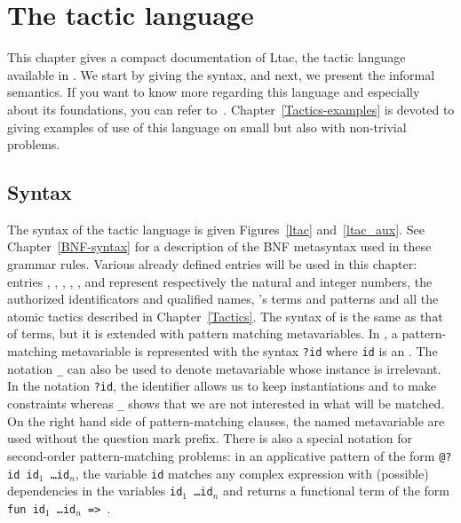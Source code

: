 \chapter[The tactic language]{The tactic language\label{TacticLanguage}}


This chapter gives a compact documentation of Ltac, the tactic
language available in {\Coq}. We start by giving the syntax, and next,
we present the informal semantics. If you want to know more regarding
this language and especially about its foundations, you can refer
to~\cite{Del00}. Chapter~\ref{Tactics-examples} is devoted to giving
examples of use of this language on small but also with non-trivial
problems.


\section{Syntax}

\def\tacexpr{\textrm{\textsl{expr}}}
\def\tacexprlow{\textrm{\textsl{tacexpr$_1$}}}
\def\tacexprinf{\textrm{\textsl{tacexpr$_2$}}}
\def\tacexprpref{\textrm{\textsl{tacexpr$_3$}}}
\def\atom{\textrm{\textsl{atom}}}
\def\letclause{\textrm{\textsl{let\_clause}}}
\def\matchrule{\textrm{\textsl{match\_rule}}}
\def\contextrule{\textrm{\textsl{context\_rule}}}
\def\contexthyp{\textrm{\textsl{context\_hyp}}}
\def\tacarg{\nterm{tacarg}}
\def\cpattern{\nterm{cpattern}}

The syntax of the tactic language is given Figures~\ref{ltac}
and~\ref{ltac_aux}. See Chapter~\ref{BNF-syntax} for a description of
the BNF metasyntax used in these grammar rules. Various already
defined entries will be used in this chapter: entries
{\naturalnumber}, {\integer}, {\ident}, {\qualid}, {\term},
{\cpattern} and {\atomictac} represent respectively the natural and
integer numbers, the authorized identificators and qualified names,
{\Coq}'s terms and patterns and all the atomic tactics described in
Chapter~\ref{Tactics}. The syntax of {\cpattern} is the same as that
of terms, but it is extended with pattern matching metavariables. In
{\cpattern}, a pattern-matching metavariable is represented with the
syntax {\tt ?id} where {\tt id} is an {\ident}. The notation {\tt \_}
can also be used to denote metavariable whose instance is
irrelevant. In the notation {\tt ?id}, the identifier allows us to
keep instantiations and to make constraints whereas {\tt \_} shows
that we are not interested in what will be matched. On the right hand
side of pattern-matching clauses, the named metavariable are used
without the question mark prefix. There is also a special notation for
second-order pattern-matching problems: in an applicative pattern of
the form {\tt @?id id$_1$ \ldots id$_n$}, the variable {\tt id}
matches any complex expression with (possible) dependencies in the
variables {\tt id$_1$ \ldots id$_n$} and returns a functional term of
the form {\tt fun id$_1$ \ldots id$_n$ => {\term}}.


